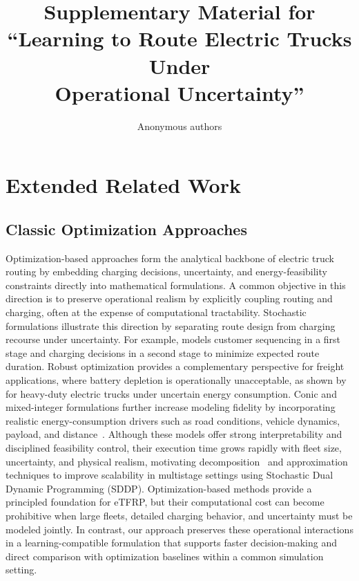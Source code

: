 \documentclass[journal]{IEEEtran}
\begin{document}
\title{Supplementary Material for\\ ``Learning to Route Electric Trucks Under\\ Operational Uncertainty''}
\author{Anonymous authors}
\maketitle

\section{Extended Related Work}

\subsection{Classic Optimization Approaches}

Optimization-based approaches form the analytical backbone of electric truck routing by embedding charging decisions, uncertainty, and energy-feasibility constraints directly into mathematical formulations. A common objective in this direction is to preserve operational realism by explicitly coupling routing and charging, often at the expense of computational tractability. Stochastic formulations illustrate this direction by separating route design from charging recourse under uncertainty. For example, \cite{SPINELLI2026105480} models customer sequencing in a first stage and charging decisions in a second stage to minimize expected route duration. Robust optimization provides a complementary perspective for freight applications, where battery depletion is operationally unacceptable, as shown by \cite{AMIRI2023109108} for heavy-duty electric trucks under uncertain energy consumption. Conic and mixed-integer formulations further increase modeling fidelity by incorporating realistic energy-consumption drivers such as road conditions, vehicle dynamics, payload, and distance~\citep{WANG2024123407}. Although these models offer strong interpretability and disciplined feasibility control, their execution time grows rapidly with fleet size, uncertainty, and physical realism, motivating decomposition~\citep{ziyan2025} and approximation~\cite{lara_electric_2020} techniques to improve scalability in multistage settings using Stochastic Dual Dynamic Programming (SDDP). 
Optimization-based methods provide a principled foundation for eTFRP, but their computational cost can become prohibitive when large fleets, detailed charging behavior, and uncertainty must be modeled jointly. In contrast, our approach preserves these operational interactions in a learning-compatible formulation that supports faster decision-making and direct comparison with optimization baselines within a common simulation setting.
\end{document}
